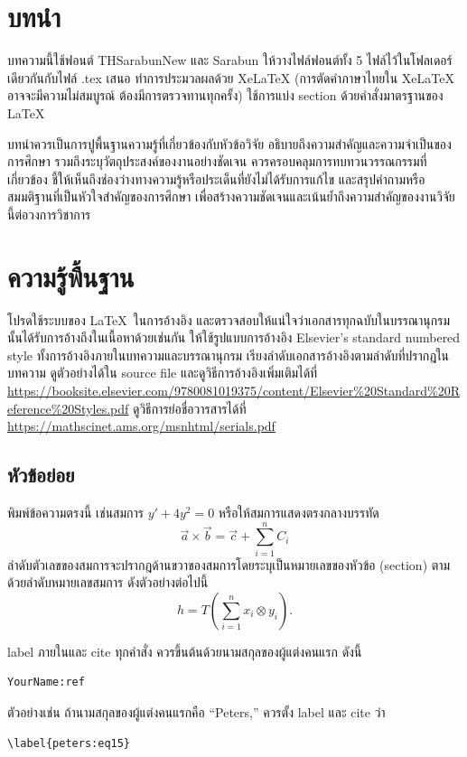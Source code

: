 \documentclass[12pt, a4paper, twoside]{article}
\theoremstyle{plain}
\theoremstyle{definition}
\theoremstyle{remark}
\numberwithin{equation}{section}
\begin{document}
\section{บทนำ}\label{yourname:intro}
บทความนี้ใช้ฟอนต์ THSarabunNew และ Sarabun ให้วางไฟล์ฟอนต์ทั้ง 5 ไฟล์ไว้ในโฟลเดอร์เดียวกันกับไฟล์ .tex เสนอ ทำการประมวลผลด้วย XeLaTeX (การตัดคำภาษาไทยใน XeLaTeX อาจจะมีความไม่สมบูรณ์ ต้องมีการตรวจทานทุกครั้ง) ใช้การแบ่ง section ด้วยคำสั่งมาตรฐานของ \LaTeX\
 
บทนำควรเป็นการปูพื้นฐานความรู้ที่เกี่ยวข้องกับหัวข้อวิจัย อธิบายถึงความสำคัญและความจำเป็นของการศึกษา รวมถึงระบุวัตถุประสงค์ของงานอย่างชัดเจน ควรครอบคลุมการทบทวนวรรณกรรมที่เกี่ยวข้อง ชี้ให้เห็นถึงช่องว่างทางความรู้หรือประเด็นที่ยังไม่ได้รับการแก้ไข และสรุปคำถามหรือสมมติฐานที่เป็นหัวใจสำคัญของการศึกษา เพื่อสร้างความชัดเจนและเน้นย้ำถึงความสำคัญของงานวิจัยนี้ต่อวงการวิชาการ
 
\section{ความรู้พื้นฐาน}\label{yourname:prelim}

โปรดใช้ระบบของ \LaTeX\ ในการอ้างอิง \cite{yourname:book, yourname:bookthai, yourname:bookchapter} และตรวจสอบให้แน่ใจว่าเอกสารทุกฉบับในบรรณานุกรมนั้นได้รับการอ้างถึงในเนื้อหาด้วยเช่นกัน ให้ใช้รูปแบบการอ้างอิง Elsevier's standard numbered style ทั้งการอ้างอิงภายในบทความและบรรณานุกรม เรียงลำดับเอกสารอ้างอิงตามลำดับที่ปรากฎในบทความ 
ดูตัวอย่างได้ใน source file และดูวิธีการอ้างอิงเพิ่มเติมได้ที่ \url{https://booksite.elsevier.com/9780081019375/content/Elsevier\%20Standard\%20Reference\%20Styles.pdf} ดูวิธีการย่อชื่อวารสารได้ที่ \\ \url{https://mathscinet.ams.org/msnhtml/serials.pdf}

\subsection{หัวข้อย่อย}\label{yourname:intro_I}
พิมพ์ข้อความตรงนี้ เช่นสมการ $y'+4y^2=0$ หรือให้สมการแสดงตรงกลางบรรทัด
\[
	\vec{a}\times\vec{b} = \vec{c}+\sum_{i=1}^n C_i 
\]
ลำดับตัวเลขของสมการจะปรากฎด้านขวาของสมการโดยระบุเป็นหมายเลขของหัวข้อ (section) ตามด้วยลำดับหมายเลขสมการ ดังตัวอย่างต่อไปนี้
\begin{equation}\label{yourname:eq15}
	h =T \left ( \sum_{i=1}^n x_i \otimes y_i \right ).
\end{equation}

label ภายในและ cite ทุกคำสั่ง ควรขึ้นต้นด้วยนามสกุลของผู้แต่งคนแรก ดังนี้
\begin{verbatim}
YourName:ref
\end{verbatim}
ตัวอย่างเช่น ถ้านามสกุลของผู้แต่งคนแรกคือ ``Peters,'' ควรตั้ง label และ cite ว่า
\begin{verbatim}
\label{peters:eq15}
\end{verbatim}
\end{document}
